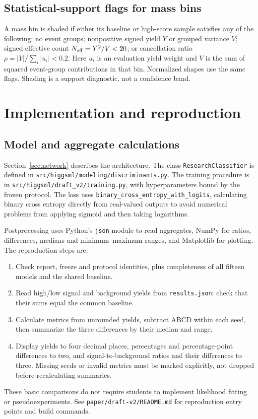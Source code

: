 \documentclass[11pt,a4paper]{article}
\begin{document}
\subsection{Statistical-support flags for mass bins}
A mass bin is shaded if either its baseline or high-score sample satisfies any of the following: no event groups; nonpositive signed yield $Y$ or grouped variance $V$; signed effective count $N_{\rm eff}=Y^2/V<20$; or cancellation ratio $\rho=|Y|/\sum_i|u_i|<0.2$.
Here $u_i$ is an evaluation yield weight and $V$ is the sum of squared event-group contributions in that bin.
Normalized shapes use the same flags. Shading is a support diagnostic, not a confidence band.

\section{Implementation and reproduction}\label{app:network}

\subsection{Model and aggregate calculations}
Section~\ref{sec:network} describes the architecture.
The class \texttt{ResearchClassifier} is defined in \nolinkurl{src/higgsml/modeling/discriminants.py}.
The training procedure is in \nolinkurl{src/higgsml/draft_v2/training.py}, with hyperparameters bound by the frozen protocol.
The loss uses \texttt{binary\_cross\_entropy\_with\_logits}, calculating binary cross entropy directly from real-valued outputs to avoid numerical problems from applying sigmoid and then taking logarithms.

Postprocessing uses Python's \texttt{json} module to read aggregates, NumPy for ratios, differences, medians and minimum--maximum ranges, and Matplotlib for plotting.
The reproduction steps are:
\begin{enumerate}[leftmargin=1.7em,itemsep=2pt]
\item Check report, freeze and protocol identities, plus completeness of all fifteen models and the shared baseline.
\item Read high/low signal and background yields from \texttt{results.json}; check that their sums equal the common baseline.
\item Calculate metrics from unrounded yields, subtract ABCD within each seed, then summarize the three differences by their median and range.
\item Display yields to four decimal places, percentages and percentage-point differences to two, and signal-to-background ratios and their differences to three.
Missing seeds or invalid metrics must be marked explicitly, not dropped before recalculating summaries.
\end{enumerate}
These basic comparisons do not require students to implement likelihood fitting or pseudoexperiments.
See \nolinkurl{paper/draft-v2/README.md} for reproduction entry points and build commands.
\end{document}
